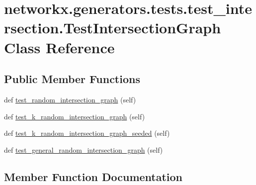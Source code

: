 \hypertarget{classnetworkx_1_1generators_1_1tests_1_1test__intersection_1_1TestIntersectionGraph}{}\section{networkx.\+generators.\+tests.\+test\+\_\+intersection.\+Test\+Intersection\+Graph Class Reference}
\label{classnetworkx_1_1generators_1_1tests_1_1test__intersection_1_1TestIntersectionGraph}
\subsection*{Public Member Functions}
\begin{DoxyCompactItemize}
\item 
def \hyperlink{classnetworkx_1_1generators_1_1tests_1_1test__intersection_1_1TestIntersectionGraph_aafbbefa0eaa78c5a6d2fe923a6c69c68}{test\+\_\+random\+\_\+intersection\+\_\+graph} (self)
\item 
def \hyperlink{classnetworkx_1_1generators_1_1tests_1_1test__intersection_1_1TestIntersectionGraph_af759d43d21eeb44c868f558c1e552524}{test\+\_\+k\+\_\+random\+\_\+intersection\+\_\+graph} (self)
\item 
def \hyperlink{classnetworkx_1_1generators_1_1tests_1_1test__intersection_1_1TestIntersectionGraph_a9f70e143eb8f1ea02505421bbb6a4142}{test\+\_\+k\+\_\+random\+\_\+intersection\+\_\+graph\+\_\+seeded} (self)
\item 
def \hyperlink{classnetworkx_1_1generators_1_1tests_1_1test__intersection_1_1TestIntersectionGraph_a1081ef61ee58c48b1a8f57454ddb93a3}{test\+\_\+general\+\_\+random\+\_\+intersection\+\_\+graph} (self)
\end{DoxyCompactItemize}


\subsection{Member Function Documentation}
\mbox{\label{classnetworkx_1_1generators_1_1tests_1_1test__intersection_1_1TestIntersectionGraph_a1081ef61ee58c48b1a8f57454ddb93a3}} 

